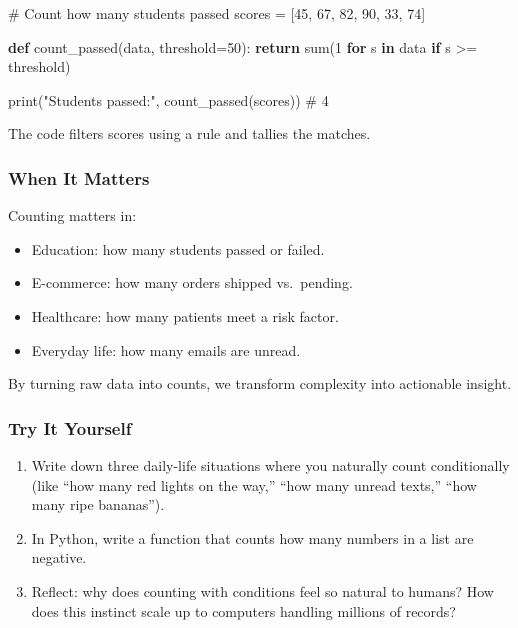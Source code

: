 \documentclass[
  letterpaper,
  DIV=11,
  numbers=noendperiod]{scrreprt}
\newenvironment{Shaded}{\begin{snugshade}}{\end{snugshade}}
\newcommand{\BuiltInTok}[1]{\textcolor[rgb]{0.00,0.23,0.31}{#1}}
\newcommand{\CommentTok}[1]{\textcolor[rgb]{0.37,0.37,0.37}{#1}}
\newcommand{\ControlFlowTok}[1]{\textcolor[rgb]{0.00,0.23,0.31}{\textbf{#1}}}
\newcommand{\DecValTok}[1]{\textcolor[rgb]{0.68,0.00,0.00}{#1}}
\newcommand{\KeywordTok}[1]{\textcolor[rgb]{0.00,0.23,0.31}{\textbf{#1}}}
\newcommand{\NormalTok}[1]{\textcolor[rgb]{0.00,0.23,0.31}{#1}}
\newcommand{\OperatorTok}[1]{\textcolor[rgb]{0.37,0.37,0.37}{#1}}
\newcommand{\StringTok}[1]{\textcolor[rgb]{0.13,0.47,0.30}{#1}}
\providecommand{\tightlist}{%
  \setlength{\itemsep}{0pt}\setlength{\parskip}{0pt}}
\begin{document}
\begin{Shaded}
\begin{Highlighting}[]
\CommentTok{\# Count how many students passed}
\NormalTok{scores }\OperatorTok{=}\NormalTok{ [}\DecValTok{45}\NormalTok{, }\DecValTok{67}\NormalTok{, }\DecValTok{82}\NormalTok{, }\DecValTok{90}\NormalTok{, }\DecValTok{33}\NormalTok{, }\DecValTok{74}\NormalTok{]}

\KeywordTok{def}\NormalTok{ count\_passed(data, threshold}\OperatorTok{=}\DecValTok{50}\NormalTok{):}
    \ControlFlowTok{return} \BuiltInTok{sum}\NormalTok{(}\DecValTok{1} \ControlFlowTok{for}\NormalTok{ s }\KeywordTok{in}\NormalTok{ data }\ControlFlowTok{if}\NormalTok{ s }\OperatorTok{\textgreater{}=}\NormalTok{ threshold)}

\BuiltInTok{print}\NormalTok{(}\StringTok{"Students passed:"}\NormalTok{, count\_passed(scores))  }\CommentTok{\# 4}
\end{Highlighting}
\end{Shaded}

The code filters scores using a rule and tallies the matches.

\subsubsection{When It Matters}\label{when-it-matters-94}

Counting matters in:

\begin{itemize}
\tightlist
\item
  Education: how many students passed or failed.
\item
  E-commerce: how many orders shipped vs.~pending.
\item
  Healthcare: how many patients meet a risk factor.
\item
  Everyday life: how many emails are unread.
\end{itemize}

By turning raw data into counts, we transform complexity into actionable
insight.

\subsubsection{Try It Yourself}\label{try-it-yourself-96}

\begin{enumerate}
\def\labelenumi{\arabic{enumi}.}
\tightlist
\item
  Write down three daily-life situations where you naturally count
  conditionally (like ``how many red lights on the way,'' ``how many
  unread texts,'' ``how many ripe bananas'').
\item
  In Python, write a function that counts how many numbers in a list are
  negative.
\item
  Reflect: why does counting with conditions feel so natural to humans?
  How does this instinct scale up to computers handling millions of
  records?
\end{enumerate}
\end{document}
